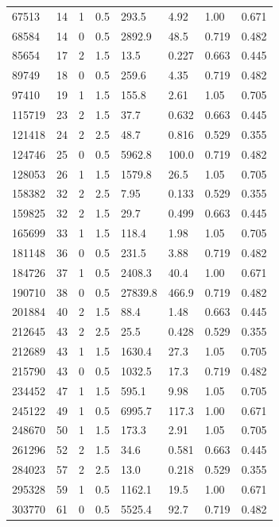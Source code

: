 \documentclass[preview]{standalone}
\begin{document}
{{\begin{tabular}{L{1.2cm}C{1.2cm} C{0.3cm}C{0.5cm} C{1.4cm}C{1.4cm} C{1.4cm}C{1.4cm}}
  67513  &    14  & 1     & 0.5 &  293.5  & 4.92  & 1.00 &  0.671   \\ 
  68584  &    14  & 0     & 0.5 &  2892.9  & 48.5  & 0.719 &  0.482   \\ 
  85654  &    17  & 2     & 1.5 &  13.5  & 0.227  & 0.663 &  0.445   \\ 
  89749  &    18  & 0     & 0.5 &  259.6  & 4.35  & 0.719 &  0.482   \\ 
  97410  &    19  & 1     & 1.5 &  155.8  & 2.61  & 1.05 &  0.705   \\ 
  115719  &    23  & 2     & 1.5 &  37.7  & 0.632  & 0.663 &  0.445   \\ 
  121418  &    24  & 2     & 2.5 &  48.7  & 0.816  & 0.529 &  0.355   \\ 
  124746  &    25  & 0     & 0.5 &  5962.8  & 100.0  & 0.719 &  0.482   \\ 
  128053  &    26  & 1     & 1.5 &  1579.8  & 26.5  & 1.05 &  0.705   \\ 
  158382  &    32  & 2     & 2.5 &  7.95  & 0.133  & 0.529 &  0.355   \\ 
  159825  &    32  & 2     & 1.5 &  29.7  & 0.499  & 0.663 &  0.445   \\ 
  165699  &    33  & 1     & 1.5 &  118.4  & 1.98  & 1.05 &  0.705   \\ 
  181148  &    36  & 0     & 0.5 &  231.5  & 3.88  & 0.719 &  0.482   \\ 
  184726  &    37  & 1     & 0.5 &  2408.3  & 40.4  & 1.00 &  0.671   \\ 
  190710  &    38  & 0     & 0.5 &  27839.8  & 466.9  & 0.719 &  0.482   \\ 
  201884  &    40  & 2     & 1.5 &  88.4  & 1.48  & 0.663 &  0.445   \\ 
  212645  &    43  & 2     & 2.5 &  25.5  & 0.428  & 0.529 &  0.355   \\ 
  212689  &    43  & 1     & 1.5 &  1630.4  & 27.3  & 1.05 &  0.705   \\ 
  215790  &    43  & 0     & 0.5 &  1032.5  & 17.3  & 0.719 &  0.482   \\ 
  234452  &    47  & 1     & 1.5 &  595.1  & 9.98  & 1.05 &  0.705   \\ 
  245122  &    49  & 1     & 0.5 &  6995.7  & 117.3  & 1.00 &  0.671   \\ 
  248670  &    50  & 1     & 1.5 &  173.3  & 2.91  & 1.05 &  0.705   \\ 
  261296  &    52  & 2     & 1.5 &  34.6  & 0.581  & 0.663 &  0.445   \\ 
  284023  &    57  & 2     & 2.5 &  13.0  & 0.218  & 0.529 &  0.355   \\ 
  295328  &    59  & 1     & 0.5 &  1162.1  & 19.5  & 1.00 &  0.671   \\ 
  303770  &    61  & 0     & 0.5 &  5525.4  & 92.7  & 0.719 &  0.482   \\ 
\hline 
\end{tabular} 

}}
\end{document}
